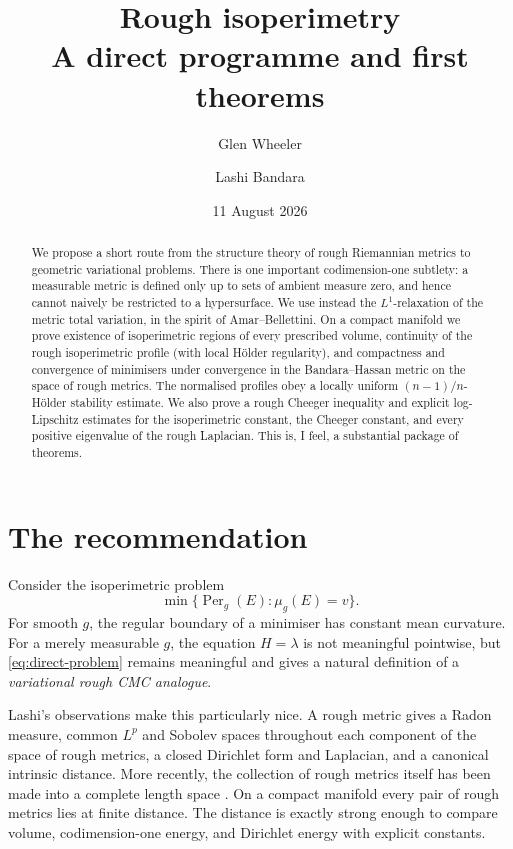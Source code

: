 \documentclass[11pt]{amsart}
\title[Rough isoperimetry]{Rough isoperimetry\\
\large A direct programme and first theorems}
\author{Glen Wheeler}
\author{Lashi Bandara}
\date{11 August 2026}
\theoremstyle{definition}
\theoremstyle{remark}
\newcommand{\Per}{\operatorname{Per}}
\begin{document}
\begin{abstract}
We propose a short route from the structure theory of rough Riemannian
metrics to geometric variational problems.  There is one important codimension-one subtlety: a
measurable metric is defined only up to sets of ambient measure zero, and hence
cannot naively be restricted to a hypersurface.  We use instead the
$L^1$-relaxation of the metric total variation, in the spirit of
Amar--Bellettini.  On a compact manifold we prove existence of isoperimetric
regions of every prescribed volume, continuity of the rough isoperimetric
profile (with local H\"older regularity), and compactness and convergence of
minimisers under convergence in the Bandara--Hassan metric on the space of
rough metrics.  The normalised profiles obey a locally uniform
$(n-1)/n$-H\"older stability estimate.  We also prove a
rough Cheeger inequality and explicit log-Lipschitz estimates for the
isoperimetric constant, the Cheeger constant, and every positive eigenvalue of
the rough Laplacian.  This is, I feel, a substantial package of theorems.
\end{abstract}

\maketitle

\section{The recommendation}

Consider the isoperimetric problem
\begin{equation}\label{eq:direct-problem}
 \min\bigl\{\Per_g(E):\mu_g(E)=v\bigr\}.
\end{equation}
For smooth $g$, the regular boundary of a minimiser has constant mean
curvature.  
 For a
merely measurable $g$, the equation $H=\lambda$ is not meaningful pointwise, but
\eqref{eq:direct-problem} remains meaningful and gives a natural
definition of a \emph{variational rough CMC analogue}.

Lashi's observations make this particularly nice.
A rough metric gives a
Radon measure, common $L^p$ and Sobolev spaces throughout each component of
the space of rough metrics, a closed Dirichlet form and Laplacian, and a
canonical intrinsic distance.  More recently, the collection of rough
metrics itself has been made into a complete length space
\cite{BandaraHassan2025}.  On a compact manifold every pair of rough metrics
lies at finite distance.  The distance is exactly strong enough to compare
volume, codimension-one energy, and Dirichlet energy with explicit constants.
\end{document}
